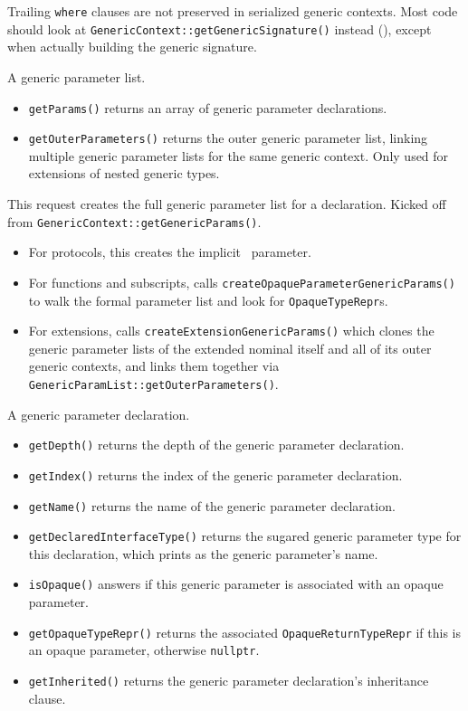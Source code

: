 \documentclass[../generics]{subfiles}
\begin{document}
Trailing \texttt{where} clauses are not preserved in serialized generic contexts. Most code should look at \texttt{GenericContext::getGenericSignature()} instead (), except when actually building the generic signature.


A generic parameter list.
\begin{itemize}
\item \texttt{getParams()} returns an array of generic parameter declarations.
\item \texttt{getOuterParameters()} returns the outer generic parameter list, linking multiple generic parameter lists for the same generic context. Only used for extensions of nested generic types.
\end{itemize}

This request creates the full generic parameter list for a declaration. Kicked off from \texttt{GenericContext::getGenericParams()}.
\begin{itemize}
\item For protocols, this creates the implicit \tSelf\ parameter.
\item For functions and subscripts, calls \texttt{createOpaqueParameterGenericParams()} to walk the formal parameter list and look for \texttt{OpaqueTypeRepr}s.
\item For extensions, calls \texttt{createExtensionGenericParams()} which clones the generic parameter lists of the extended nominal itself and all of its outer generic contexts, and links them together via \texttt{GenericParamList::getOuterParameters()}.
\end{itemize}

A generic parameter declaration.
\begin{itemize}
\item {}\texttt{getDepth()} returns the depth of the generic parameter declaration.
\item {}\texttt{getIndex()} returns the index of the generic parameter declaration.
\item \texttt{getName()} returns the name of the generic parameter declaration.
\item \texttt{getDeclaredInterfaceType()} returns the sugared generic parameter type for this declaration, which prints as the generic parameter's name.
\item \texttt{isOpaque()} answers if this generic parameter is associated with an opaque parameter.
\item \texttt{getOpaqueTypeRepr()} returns the associated \texttt{OpaqueReturnTypeRepr} if this is an opaque parameter, otherwise \texttt{nullptr}.
\item \texttt{getInherited()} returns the generic parameter declaration's inheritance clause.
\end{itemize}
\end{document}
